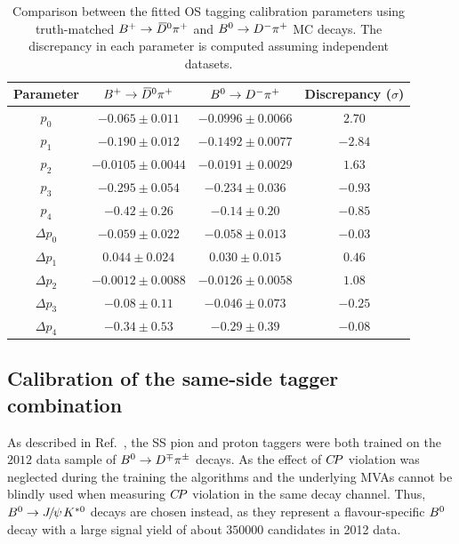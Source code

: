 \begin{table}[t!]
        \centering
        \caption{Comparison between the fitted OS tagging calibration parameters using truth-matched $B^+\rightarrow\kern 0.2em\overline{\kern -0.2em D}{}^0\pi^+$ and $B^0\rightarrow D^-\pi^+$ MC decays. The discrepancy in each parameter is computed assuming independent datasets.}
        \begin{tabular}{cccc}
          \toprule
          Parameter   &  $B^+\rightarrow\kern 0.2em\overline{\kern -0.2em D}{}^0\pi^+$   &  $B^0\rightarrow D^-\pi^+$  &   Discrepancy ($\sigma$) \\
          \midrule
          $p_0$   &   $-0.065\pm0.011$   &   $-0.0996\pm0.0066$   &   $2.70$ \\
          $p_1$   &   $-0.190\pm0.012$   &   $-0.1492\pm0.0077$   &   $-2.84$ \\
          $p_2$   &   $-0.0105\pm0.0044$   &   $-0.0191\pm0.0029$   &   $1.63$ \\
          $p_3$   &   $-0.295\pm0.054$   &   $-0.234\pm0.036$   &   $-0.93$ \\
          $p_4$   &   $-0.42\pm0.26$   &   $-0.14\pm0.20$   &   $-0.85$ \\
          $\Delta p_0$   &   $-0.059\pm0.022$   &   $-0.058\pm0.013$   &   $-0.03$ \\
          $\Delta p_1$   &   $0.044\pm0.024$   &   $0.030\pm0.015$   &   $0.46$ \\
          $\Delta p_2$   &   $-0.0012\pm0.0088$   &   $-0.0126\pm0.0058$   &   $1.08$ \\
          $\Delta p_3$   &   $-0.08\pm0.11$   &   $-0.046\pm0.073$   &   $-0.25$ \\
          $\Delta p_4$   &   $-0.34\pm0.53$   &   $-0.29\pm0.39$   &   $-0.08$ \\
          \bottomrule
        \end{tabular}
        \label{tab:os_calib_portability_mc}
\end{table}

\subsection{Calibration of the same-side tagger combination}
\label{sec:tagging:SScalib}

As described in Ref.~\cite{LHCb-PAPER-2016-039}, the SS pion and proton taggers
were both trained on the $\num{2012}$ data sample of
$B^0\rightarrow D^\mp\pi^\pm$ decays. As the effect of $C\!P$ violation was neglected during the
training the algorithms and the underlying MVAs cannot be blindly used when
measuring $C\!P$ violation in the same decay channel. Thus, $\Bz\to\jpsi\Kstarz$
decays are chosen instead, as they represent a flavour-specific $B^0$ decay with
a large signal yield of about $350000$ candidates in 2012 data. 

